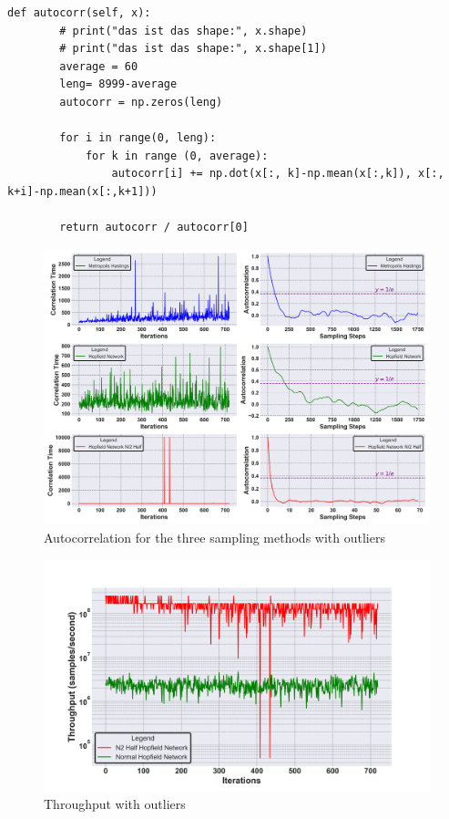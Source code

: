 \label{attachement:autocorrelation}
\begin{lstlisting}
def autocorr(self, x):
        # print("das ist das shape:", x.shape)
        # print("das ist das shape:", x.shape[1])
        average = 60
        leng= 8999-average
        autocorr = np.zeros(leng)
        
        for i in range(0, leng):
            for k in range (0, average):
                autocorr[i] += np.dot(x[:, k]-np.mean(x[:,k]), x[:, k+i]-np.mean(x[:,k+1])) 

        return autocorr / autocorr[0]
\end{lstlisting}

\label{attachement:autocorrelation_errors}
\begin{figure}[H]
  \centering
  \includegraphics[width=0.9\linewidth]{graphics/Visualisierungen_Autocorr_individual_8.png}
  \caption{Autocorrelation for the three sampling methods with outliers}
\end{figure}

\label{attachement:throughput_errors}
\begin{figure}[H]
  \centering
  \includegraphics[width=0.8\linewidth]{graphics/Visualisierungen_throughput_log_3.png}
  \caption{Throughput with outliers}
\end{figure}